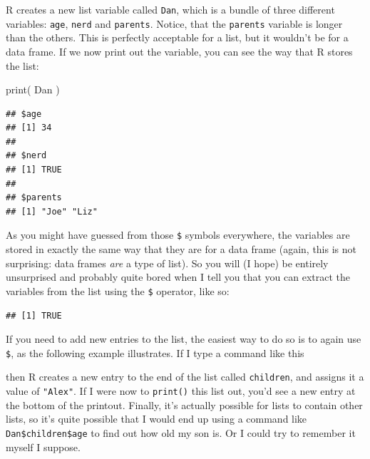 \documentclass[
]{book}
\newenvironment{Shaded}{\begin{snugshade}}{\end{snugshade}}
\newcommand{\FunctionTok}[1]{\textcolor[rgb]{0.00,0.00,0.00}{#1}}
\newcommand{\NormalTok}[1]{#1}
\newcommand{\OtherTok}[1]{\textcolor[rgb]{0.56,0.35,0.01}{#1}}
\newcommand{\SpecialCharTok}[1]{\textcolor[rgb]{0.00,0.00,0.00}{#1}}
\newcommand{\StringTok}[1]{\textcolor[rgb]{0.31,0.60,0.02}{#1}}
\begin{document}
R creates a new list variable called \texttt{Dan}, which is a bundle of three different variables: \texttt{age}, \texttt{nerd} and \texttt{parents}. Notice, that the \texttt{parents} variable is longer than the others. This is perfectly acceptable for a list, but it wouldn't be for a data frame. If we now print out the variable, you can see the way that R stores the list:

\begin{Shaded}
\begin{Highlighting}[]
\FunctionTok{print}\NormalTok{( Dan )}
\end{Highlighting}
\end{Shaded}

\begin{verbatim}
## $age
## [1] 34
## 
## $nerd
## [1] TRUE
## 
## $parents
## [1] "Joe" "Liz"
\end{verbatim}

As you might have guessed from those \texttt{\$} symbols everywhere, the variables are stored in exactly the same way that they are for a data frame (again, this is not surprising: data frames \emph{are} a type of list). So you will (I hope) be entirely unsurprised and probably quite bored when I tell you that you can extract the variables from the list using the \texttt{\$} operator, like so:

\begin{Shaded}
\end{Shaded}

\begin{verbatim}
## [1] TRUE
\end{verbatim}

If you need to add new entries to the list, the easiest way to do so is to again use \texttt{\$}, as the following example illustrates. If I type a command like this

\begin{Shaded}
\end{Shaded}

then R creates a new entry to the end of the list called \texttt{children}, and assigns it a value of \texttt{"Alex"}. If I were now to \texttt{print()} this list out, you'd see a new entry at the bottom of the printout. Finally, it's actually possible for lists to contain other lists, so it's quite possible that I would end up using a command like \texttt{Dan\$children\$age} to find out how old my son is. Or I could try to remember it myself I suppose.
\end{document}
